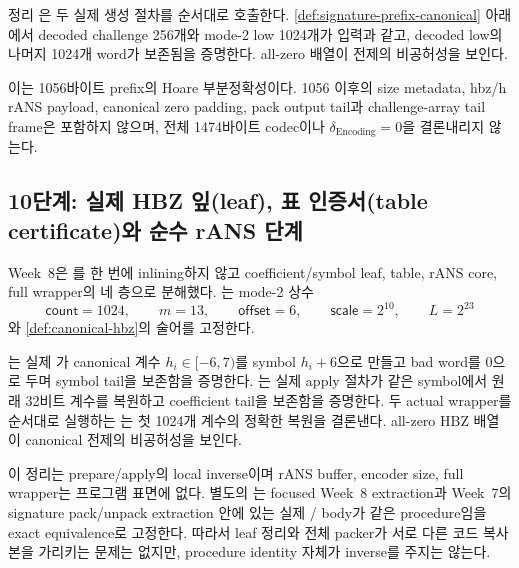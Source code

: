 \begin{verified}[서명 접두부 코덱]
\label{thm:signature-prefix-codec}
정리 은 두 실제 생성 절차를
순서대로 호출한다. \cref{def:signature-prefix-canonical} 아래에서 decoded
challenge 256개와 mode-2 low 1024개가 입력과 같고, decoded low의 나머지
1024개 word가 보존됨을 증명한다. all-zero 배열이 전제의 비공허성을 보인다.
\end{verified}

이는 1056바이트 prefix의 Hoare 부분정확성이다. 1056 이후의 size metadata,
hbz/h rANS payload, canonical zero padding, pack output tail과 challenge-array
tail frame은 포함하지 않으며, 전체 1474바이트 codec이나
\(\delta_{\mathrm{Encoding}}=0\)을 결론내리지 않는다.

\subsection{10단계: 실제 HBZ 잎(leaf), 표 인증서(table certificate)와 순수 rANS 단계}

Week~8은 를 한 번에 inlining하지 않고
coefficient/symbol leaf, table, rANS core, full wrapper의 네 층으로 분해했다.
는 mode-2 상수
\[
  \mathsf{count}=1024,\qquad m=13,\qquad \mathsf{offset}=6,\qquad
  \mathsf{scale}=2^{10},\qquad L=2^{23}
\]
와 \cref{def:canonical-hbz}의 술어를 고정한다.

\begin{verified}
\label{thm:hbz-leaf-inverse}
는 실제
가 canonical 계수 \(h_i\in[-6,7)\)를
symbol \(h_i+6\)으로 만들고 bad word를 0으로 두며 symbol tail을 보존함을
증명한다. 는 실제 apply 절차가 같은
symbol에서 원래 32비트 계수를 복원하고 coefficient tail을 보존함을 증명한다.
두 actual wrapper를 순서대로 실행하는
는 첫 1024개 계수의 정확한
복원을 결론낸다. all-zero HBZ 배열이 canonical 전제의 비공허성을 보인다.
\end{verified}

이 정리는 prepare/apply의 local inverse이며 rANS buffer, encoder size, full
wrapper는 프로그램 표면에 없다. 별도의
는 focused Week~8 extraction과 Week~7의
signature pack/unpack extraction 안에 있는 실제
/ body가 같은
procedure임을 exact equivalence로 고정한다. 따라서 leaf 정리와 전체 packer가
서로 다른 코드 복사본을 가리키는 문제는 없지만, procedure identity 자체가
inverse를 주지는 않는다.

